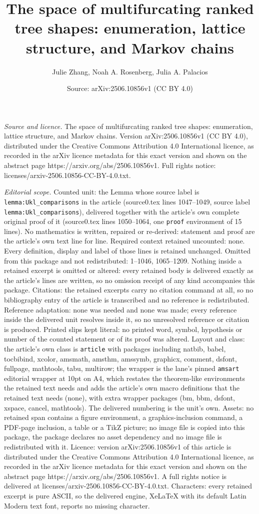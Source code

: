 \documentclass[10pt,a4paper]{amsart}
\title[The space of multifurcating ranked tree shapes: enumeration,]{The space of multifurcating ranked tree shapes: enumeration, lattice structure, and Markov chains}
\author{Julie Zhang, Noah A. Rosenberg, Julia A. Palacios}
\date{Source: arXiv:2506.10856v1 (CC BY 4.0)}
\begin{document}
\maketitle

\noindent\emph{Source and licence.} The space of multifurcating ranked tree shapes: enumeration, lattice structure, and Markov chains. Version arXiv:2506.10856v1 (CC BY 4.0), distributed under the Creative Commons Attribution 4.0 International licence, as recorded in the arXiv licence metadata for this exact version and shown on the abstract page https://arxiv.org/abs/2506.10856v1. Full rights notice: licenses/arxiv-2506.10856-CC-BY-4.0.txt.\par\smallskip

\noindent\textit{Editorial scope.} Counted unit: the Lemma whose source label is \texttt{lemma:Ukl\_comparisons} in the article (source0.tex lines 1047--1049, source label \texttt{lemma:Ukl\_comparisons}), delivered together with the article's own complete original proof of it (source0.tex lines 1050--1064, one \texttt{proof} environment of 15 lines). No mathematics is written, repaired or re-derived: statement and proof are the article's own text line for line. Required context retained uncounted: none. Every definition, display and label of those lines is retained unchanged. Omitted from this package and not redistributed: 1--1046, 1065--1209. Nothing inside a retained excerpt is omitted or altered: every retained body is delivered exactly as the article's lines are written, so no omission receipt of any kind accompanies this package. Citations: the retained excerpts carry no citation command at all, so no bibliography entry of the article is transcribed and no reference is redistributed. Reference adaptation: none was needed and none was made; every reference inside the delivered unit resolves inside it, so no unresolved reference or citation is produced. Printed slips kept literal: no printed word, symbol, hypothesis or number of the counted statement or of its proof was altered. Layout and class: the article's own class is \texttt{article} with packages including natbib, babel, tocbibind, xcolor, amsmath, amsthm, amssymb, graphicx, comment, dsfont, fullpage, mathtools, tabu, multirow; the wrapper is the lane's pinned \texttt{amsart} editorial wrapper at 10pt on A4, which restates the theorem-like environments the retained text needs and adds the article's own macro definitions that the retained text needs (none), with extra wrapper packages (bm, bbm, dsfont, xspace, cancel, mathtools). The delivered numbering is the unit's own. Assets: no retained span contains a figure environment, a graphics-inclusion command, a PDF-page inclusion, a table or a TikZ picture; no image file is copied into this package, the package declares no asset dependency and no image file is redistributed with it. Licence: version arXiv:2506.10856v1 of this article is distributed under the Creative Commons Attribution 4.0 International licence, as recorded in the arXiv licence metadata for this exact version and shown on the abstract page https://arxiv.org/abs/2506.10856v1. A full rights notice is delivered at licenses/arxiv-2506.10856-CC-BY-4.0.txt. Characters: every retained excerpt is pure ASCII, so the delivered engine, XeLaTeX with its default Latin Modern text font, reports no missing character.
\end{document}
